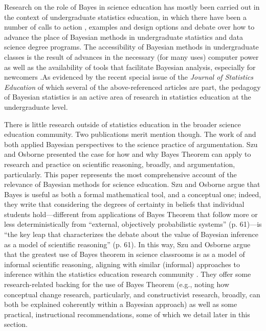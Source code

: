 \documentclass[man]{apa7}
\begin{document}
Research on the role of Bayes in science education has mostly been carried out in the context of undergraduate statistics education, in which there have been a number of calls to action \parencite{gpkpwc18, h_a20}, examples and design options \parencite{a02, b02,g08, w17, h_j} and debate \parencite{jrhrr20} over how to advance the place of Bayesian methods in undergraduate statistics and data science degree programs. The accessibility of Bayesian methods in undergraduate classes is the result of advances in the necessary (for many uses) computer power \parencite{gpkpwc18} as well as the availability of tools that facilitate Bayesian analysis, especially for newcomers \parencite{ah20} .As evidenced by the recent special issue of the \emph{Journal of Statistics Education} of which several of the above-referenced articles are part, the pedagogy of Bayesian statistics is an active area of research in statistics education at the undergraduate level.

There is little research outside of statistics education in the broader science education community. Two publications merit mention though. The work of \textcite{so12} and \textcite{n11} both applied Bayesian perspectives to the science practice of argumentation. Szu and Osborne presented the case for how and why Bayes Theorem can apply to research and practice on scientific reasoning, broadly, and argumentation, particularly. This paper represents the most comprehensive account of the relevance of Bayesian methods for science education. Szu and Osborne argue that Bayes is useful as both a formal mathematical tool, and a conceptual one; indeed, they write that considering the degrees of certainty in beliefs that individual students hold—different from applications of Bayes Theorem that follow more or less deterministically from ``external, objectively probabilistic systems'' (p. 61)—is ``the key leap that characterizes the debate about the value of Bayesian inference as a model of scientific reasoning'' (p. 61). In this way, Szu and Osborne argue that the greatest use of Bayes theorem in science classrooms is as a model of informal scientific reasoning, aligning with similar (informal) approaches to inference within the statistics education research community \parencite{batanero2016research, mr18}. They offer some research-related backing for the use of Bayes Theorem (e.g., noting how conceptual change research, particularly, and constructivist research, broadly, can both be explained coherently within a Bayesian approach) as well as some practical, instructional recommendations, some of which we detail later in this section.
\end{document}
